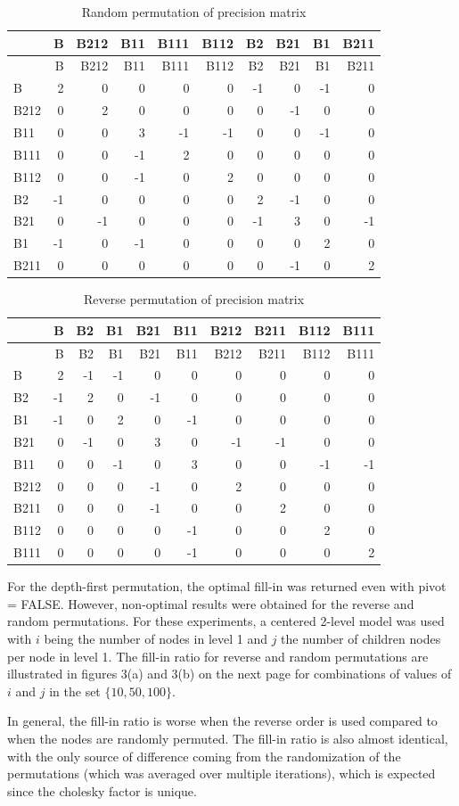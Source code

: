 \documentclass[]{article}
\begin{document}
\begin{longtable}[]{@{}lrrrrrrrrr@{}}
\caption{Random permutation of precision matrix}\tabularnewline
\toprule
& B & B212 & B11 & B111 & B112 & B2 & B21 & B1 & B211\tabularnewline
\midrule
\endfirsthead
\toprule
& B & B212 & B11 & B111 & B112 & B2 & B21 & B1 & B211\tabularnewline
\midrule
\endhead
B & 2 & 0 & 0 & 0 & 0 & -1 & 0 & -1 & 0\tabularnewline
B212 & 0 & 2 & 0 & 0 & 0 & 0 & -1 & 0 & 0\tabularnewline
B11 & 0 & 0 & 3 & -1 & -1 & 0 & 0 & -1 & 0\tabularnewline
B111 & 0 & 0 & -1 & 2 & 0 & 0 & 0 & 0 & 0\tabularnewline
B112 & 0 & 0 & -1 & 0 & 2 & 0 & 0 & 0 & 0\tabularnewline
B2 & -1 & 0 & 0 & 0 & 0 & 2 & -1 & 0 & 0\tabularnewline
B21 & 0 & -1 & 0 & 0 & 0 & -1 & 3 & 0 & -1\tabularnewline
B1 & -1 & 0 & -1 & 0 & 0 & 0 & 0 & 2 & 0\tabularnewline
B211 & 0 & 0 & 0 & 0 & 0 & 0 & -1 & 0 & 2\tabularnewline
\bottomrule
\end{longtable}

\begin{longtable}[]{@{}lrrrrrrrrr@{}}
\caption{Reverse permutation of precision matrix}\tabularnewline
\toprule
& B & B2 & B1 & B21 & B11 & B212 & B211 & B112 & B111\tabularnewline
\midrule
\endfirsthead
\toprule
& B & B2 & B1 & B21 & B11 & B212 & B211 & B112 & B111\tabularnewline
\midrule
\endhead
B & 2 & -1 & -1 & 0 & 0 & 0 & 0 & 0 & 0\tabularnewline
B2 & -1 & 2 & 0 & -1 & 0 & 0 & 0 & 0 & 0\tabularnewline
B1 & -1 & 0 & 2 & 0 & -1 & 0 & 0 & 0 & 0\tabularnewline
B21 & 0 & -1 & 0 & 3 & 0 & -1 & -1 & 0 & 0\tabularnewline
B11 & 0 & 0 & -1 & 0 & 3 & 0 & 0 & -1 & -1\tabularnewline
B212 & 0 & 0 & 0 & -1 & 0 & 2 & 0 & 0 & 0\tabularnewline
B211 & 0 & 0 & 0 & -1 & 0 & 0 & 2 & 0 & 0\tabularnewline
B112 & 0 & 0 & 0 & 0 & -1 & 0 & 0 & 2 & 0\tabularnewline
B111 & 0 & 0 & 0 & 0 & -1 & 0 & 0 & 0 & 2\tabularnewline
\bottomrule
\end{longtable}

For the depth-first permutation, the optimal fill-in was returned even
with pivot = FALSE. However, non-optimal results were obtained for the
reverse and random permutations. For these experiments, a centered
2-level model was used with \(i\) being the number of nodes in level 1
and \(j\) the number of children nodes per node in level 1. The fill-in
ratio for reverse and random permutations are illustrated in figures
3(a) and 3(b) on the next page for combinations of values of \(i\) and
\(j\) in the set \(\{10,50,100\}\).

In general, the fill-in ratio is worse when the reverse order is used
compared to when the nodes are randomly permuted. The fill-in ratio is
also almost identical, with the only source of difference coming from
the randomization of the permutations (which was averaged over multiple
iterations), which is expected since the cholesky factor is unique.
\newline \newline
\end{document}
